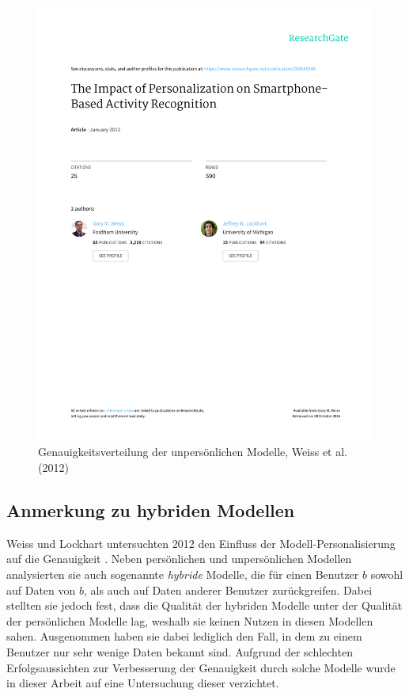 \begin{figure}
	\centering
	\includegraphics[clip,trim=110mm 186mm 10mm 55mm, page=6, scale=1]{img/Weiss2012}
	\caption{Genauigkeitsverteilung der unpersönlichen Modelle, Weiss et al. (2012) \cite{Weiss2012}}
	\label{fig:accuracy-impersonal-per-user-weiss2012}
\end{figure}

\subsection{Anmerkung zu hybriden Modellen}
Weiss und Lockhart untersuchten 2012 den Einfluss der Modell-Personalisierung auf die Genauigkeit \cite{Weiss2012}. Neben persönlichen und unpersönlichen Modellen analysierten sie auch sogenannte \textit{hybride} Modelle, die für einen Benutzer $b$ sowohl auf Daten von $b$, als auch auf Daten anderer Benutzer zurückgreifen. Dabei stellten sie jedoch fest, dass die Qualität der hybriden Modelle unter der Qualität der persönlichen Modelle lag, weshalb sie keinen Nutzen in diesen Modellen sahen. Ausgenommen haben sie dabei lediglich den Fall, in dem zu einem Benutzer nur sehr wenige Daten bekannt sind. Aufgrund der schlechten Erfolgsaussichten zur Verbesserung der Genauigkeit durch solche Modelle wurde in dieser Arbeit auf eine Untersuchung dieser verzichtet.



